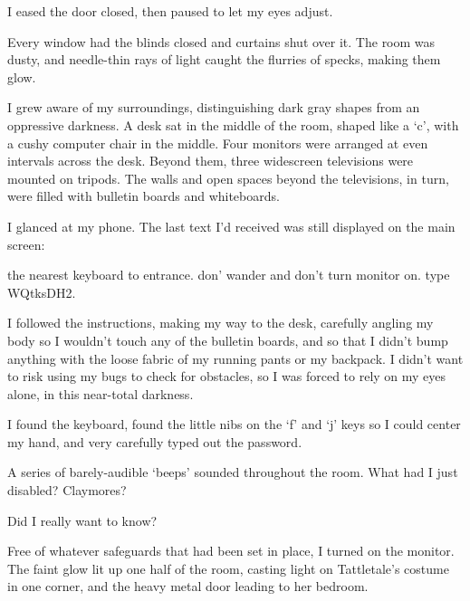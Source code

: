 





I eased the door closed, then paused to let my eyes adjust.



Every window had the blinds closed and curtains shut over it.  The room was dusty, and needle-thin rays of light caught the flurries of specks, making them glow.



I grew aware of my surroundings, distinguishing dark gray shapes from an oppressive darkness.  A desk sat in the middle of the room, shaped like a `c', with a cushy computer chair in the middle.  Four monitors were arranged at even intervals across the desk.  Beyond them, three widescreen televisions were mounted on tripods.  The walls and open spaces beyond the televisions, in turn, were filled with bulletin boards and whiteboards.



I glanced at my phone.  The last text I'd received was still displayed on the main screen:



the nearest keyboard to entrance.  don' wander and don't turn monitor on.  type WQtksDH2.



I followed the instructions, making my way to the desk, carefully angling my body so I wouldn't touch any of the bulletin boards, and so that I didn't bump anything with the loose fabric of my running pants or my backpack.  I didn't want to risk using my bugs to check for obstacles, so I was forced to rely on my eyes alone, in this near-total darkness.



I found the keyboard, found the little nibs on the `f' and `j' keys so I could center my hand, and very carefully typed out the password.



A series of barely-audible `beeps' sounded throughout the room.  What had I just disabled?  Claymores?



Did I really want to know?



Free of whatever safeguards that had been set in place, I turned on the monitor.  The faint glow lit up one half of the room, casting light on Tattletale's costume in one corner, and the heavy metal door leading to her bedroom.




